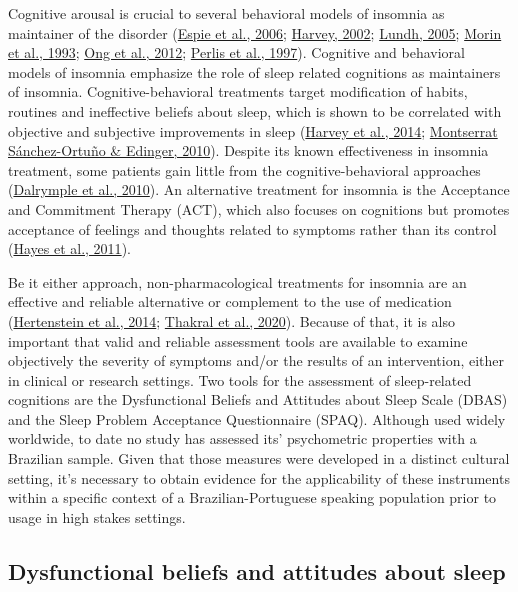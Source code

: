 \documentclass[
  ,doc,11pt, twoside,floatsintext]{apa6}
\begin{document}
Cognitive arousal is crucial to several behavioral models of insomnia as maintainer of the disorder (\protect\hyperlink{ref-espie2006}{Espie et al., 2006}; \protect\hyperlink{ref-harvey2002}{Harvey, 2002}; \protect\hyperlink{ref-lundh2005}{Lundh, 2005}; \protect\hyperlink{ref-morin1993}{Morin et al., 1993}; \protect\hyperlink{ref-ong2012}{Ong et al., 2012}; \protect\hyperlink{ref-perlis1997}{Perlis et al., 1997}). Cognitive and behavioral models of insomnia emphasize the role of sleep related cognitions as maintainers of insomnia. Cognitive-behavioral treatments target modification of habits, routines and ineffective beliefs about sleep, which is shown to be correlated with objective and subjective improvements in sleep (\protect\hyperlink{ref-harvey2014}{Harvey et al., 2014}; \protect\hyperlink{ref-montserratsanchez-ortuno2010}{Montserrat Sánchez-Ortuño \& Edinger, 2010}). Despite its known effectiveness in insomnia treatment, some patients gain little from the cognitive-behavioral approaches (\protect\hyperlink{ref-dalrymple2010}{Dalrymple et al., 2010}). An alternative treatment for insomnia is the Acceptance and Commitment Therapy (ACT), which also focuses on cognitions but promotes acceptance of feelings and thoughts related to symptoms rather than its control (\protect\hyperlink{ref-hayes2011acceptance}{Hayes et al., 2011}).

Be it either approach, non-pharmacological treatments for insomnia are an effective and reliable alternative or complement to the use of medication (\protect\hyperlink{ref-hertenstein2014}{Hertenstein et al., 2014}; \protect\hyperlink{ref-thakral2020}{Thakral et al., 2020}). Because of that, it is also important that valid and reliable assessment tools are available to examine objectively the severity of symptoms and/or the results of an intervention, either in clinical or research settings. Two tools for the assessment of sleep-related cognitions are the Dysfunctional Beliefs and Attitudes about Sleep Scale (DBAS) and the Sleep Problem Acceptance Questionnaire (SPAQ). Although used widely worldwide, to date no study has assessed its' psychometric properties with a Brazilian sample. Given that those measures were developed in a distinct cultural setting, it's necessary to obtain evidence for the applicability of these instruments within a specific context of a Brazilian-Portuguese speaking population prior to usage in high stakes settings.

\hypertarget{dysfunctional-beliefs-and-attitudes-about-sleep}{%
\subsection{Dysfunctional beliefs and attitudes about sleep}\label{dysfunctional-beliefs-and-attitudes-about-sleep}}
\end{document}
